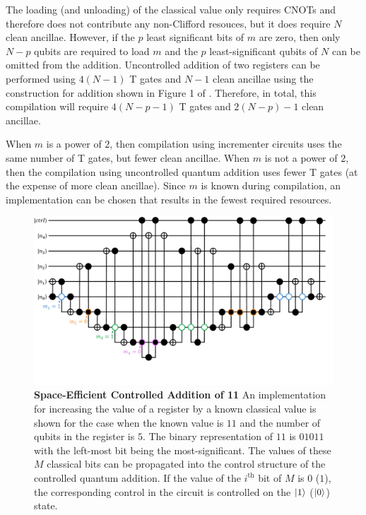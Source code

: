 The loading (and unloading) of the classical value only requires CNOTs and therefore does not contribute any non-Clifford resouces, but it does require $N$ clean ancillae.
However, if the $p$ least significant bits of $m$ are zero, then only $N - p$ qubits are required to load $m$ and the $p$ least-significant qubits of $N$ can be omitted from the addition.
Uncontrolled addition of two registers can be performed using $4(N-1)$ T gates and $N - 1$ clean ancillae using the construction for addition shown in Figure 1 of \cite{gidney2018halving}.
Therefore, in total, this compilation will require $4(N - p - 1)$ T gates and $2(N - p) - 1$ clean ancillae.

When $m$ is a power of $2$, then compilation using incrementer circuits uses the same number of T gates, but fewer clean ancillae.
When $m$ is not a power of $2$, then the compilation using uncontrolled quantum addition uses fewer T gates (at the expense of more clean ancillae).
Since $m$ is known during compilation, an implementation can be chosen that results in the fewest required resources.

\begin{figure}
    \centering
    \includegraphics[width=12cm]{figures/ctrl-add-11-qubit-efficient.pdf}
    \caption{
        \textbf{Space-Efficient Controlled Addition of 11}
        An implementation for increasing the value of a register by a known classical value is shown for the case when the known value is $11$ and the number of qubits in the register is $5$.
        The binary representation of $11$ is $01011$ with the left-most bit being the most-significant.
        The values of these $M$ classical bits can be propagated into the control structure of the controlled quantum addition.
        If the value of the $i^\text{th}$ bit of $M$ is $0$ ($1$), the corresponding control in the circuit is controlled on the $\ket{1}$  ($\ket{0}$) state.
    }
    \label{fig:addition-qubit-efficient-11}
\end{figure}

